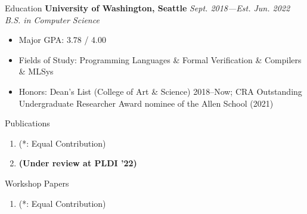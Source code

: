\documentclass{resume}
\begin{document}
	\begin{rSection}{Education}
	{\bf University of Washington, Seattle} \hfill {\em Sept. 2018---Est. Jun. 2022} \\
	\textit{B.S. in Computer Science}
	\vspace{-5pt}
        \begin{itemize}[leftmargin=*]
            \setlength{\itemsep}{1pt}
            \setlength{\parskip}{0pt}
			\setlength{\parsep}{0pt}
			\item Major GPA: 3.78 / 4.00
            \item Fields of Study: Programming Languages \& Formal Verification \& Compilers \& MLSys
            \item Honors: Dean's List (College of Art \& Science) 2018--Now; CRA Outstanding Undergraduate Researcher Award nominee of the Allen School (2021)
		\end{itemize}
	\end{rSection}
	\vspace{-5pt}
    \begin{rSection}{Publications}
		\begin{enumerate}
			\setlength{\itemsep}{1pt}
            \setlength{\parskip}{0pt}
			\setlength{\parsep}{0pt}
			\item {} (\small{*: Equal Contribution})
			\item \textbf{(Under review at PLDI '22)} 
		\end{enumerate}
        \vspace{-5pt}
	\end{rSection}
	\vspace{1pt}
	\begin{rSection}{Workshop Papers}
		\begin{enumerate}
			\setlength{\itemsep}{1pt}
            \setlength{\parskip}{0pt}
			\setlength{\parsep}{0pt}
			\item {} (\small{*: Equal Contribution})
		\end{enumerate}
        \vspace{-5pt}
	\end{rSection}
    \vspace{1pt}
\end{document}

